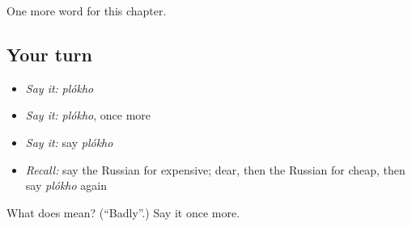 \begin{grammarlens}[title={What you've built}]
One more word for this chapter.
\end{grammarlens}

\subsection*{Your turn}
\begin{itemize}
\raggedright
  \item \emph{Say it:} \emph{plókho}
  \item \emph{Say it:} \emph{plókho}, once more
  \item \emph{Say it:} say \emph{plókho}
  \item \emph{Recall:} say the Russian for expensive; dear, then the Russian for cheap, then say \emph{plókho} again
\end{itemize}

\begin{tcolorbox}[breakable,colback=teal!4,colframe=teal!35!black,title={Before you move on}]
What does  mean? (\textquotedblleft{}Badly\textquotedblright{}.) Say it once more.
\end{tcolorbox}
